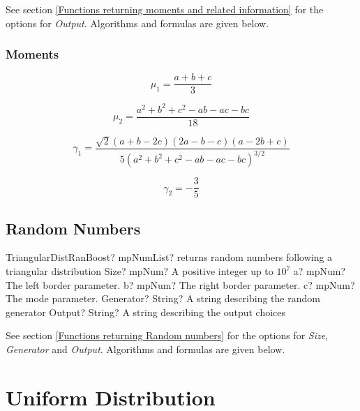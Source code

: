 \vspace{0.3cm}

See section \ref{Functions returning moments and related information} for the options for {\itshape\sffamily Output}. Algorithms and formulas are given below.

\subsubsection{Moments}

\begin{equation} 
	\mu_1 = \frac{a+b+c}{3}
\end{equation}

\begin{equation} 
	\mu_2 = \frac{a^2+b^2+c^2-ab-ac-bc}{18}
\end{equation}

\begin{equation} 
	\gamma_1 = \frac{\sqrt{2}(a+b-2c)(2a-b-c)(a-2b+c)}{5(a^2+b^2+c^2-ab-ac-bc)^{3/2}}
\end{equation}

\begin{equation} 
	\gamma_2 = -\frac{3}{5}
\end{equation}




\subsection{Random Numbers}

\begin{mpFunctionsExtract}
	\mpFunctionSix
	{TriangularDistRanBoost? mpNumList? returns random numbers following a triangular distribution}
	{Size? mpNum? A positive integer up to $10^7$}
	{a? mpNum? The left border parameter.}
	{b? mpNum? The right border parameter.}
	{c? mpNum? The mode parameter.}
	{Generator? String? A string describing the random generator}
	{Output? String? A string describing the output choices}
\end{mpFunctionsExtract}

\vspace{0.3cm}

See section \ref{Functions returning Random numbers} for the options for  {\itshape\sffamily Size},  {\itshape\sffamily Generator} and {\itshape\sffamily Output}. Algorithms and formulas are given below.





\section{Uniform Distribution}

